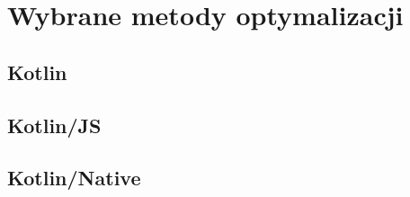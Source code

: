 \chapter{Wybrane metody optymalizacji}\label{chapter:wybrane_metody_optimalizacji}





\section{Kotlin}\label{chapter:kotlin_multiplatform}

\section{Kotlin/JS}\label{chapter:kotlin_js}

\section{Kotlin/Native}\label{chapter:kotlin_native}
